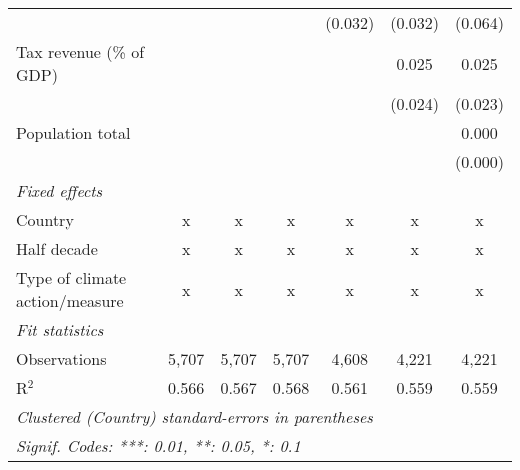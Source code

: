 \begin{tabular}{lcccccc}
                                                   &         &               &                & (0.032)        & (0.032)        & (0.064)\\   
   Tax revenue (\% of GDP)                         &         &               &                &                & 0.025          & 0.025\\   
                                                   &         &               &                &                & (0.024)        & (0.023)\\   
   Population total                                &         &               &                &                &                & 0.000\\   
                                                   &         &               &                &                &                & (0.000)\\   
   \emph{Fixed effects}\\
   Country                                         & x       & x             & x              & x              & x              & x\\  
   Half decade                                     & x       & x             & x              & x              & x              & x\\  
   Type of climate action/measure                  & x       & x             & x              & x              & x              & x\\  
   \midrule \emph{Fit statistics}\\
   Observations                                    & 5,707   & 5,707         & 5,707          & 4,608          & 4,221          & 4,221\\  
   R$^2$                                           & 0.566   & 0.567         & 0.568          & 0.561          & 0.559          & 0.559\\  
   \midrule
   \multicolumn{7}{l}{\emph{Clustered (Country) standard-errors in parentheses}}\\
   \multicolumn{7}{l}{\emph{Signif. Codes: ***: 0.01, **: 0.05, *: 0.1}}\\
\end{tabular}
\par\endgroup


